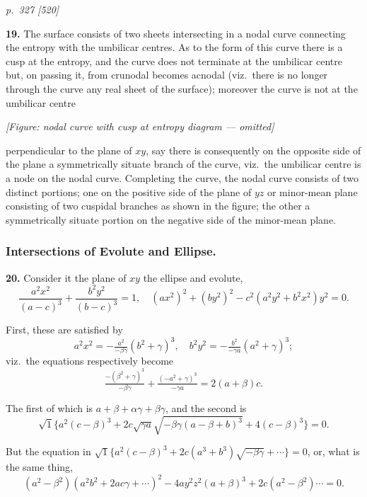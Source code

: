 \documentclass[11pt,a4paper]{article}
\theoremstyle{plain}
\theoremstyle{definition}
\begin{document}
\clearpage

\bigskip
\textit{p.~327 [520]}
\smallskip

\textbf{19.} The surface consists of two sheets intersecting in a nodal curve connecting the entropy with the umbilicar centres. As to the form of this curve there is a cusp at the entropy, and the curve does not terminate at the umbilicar centre but, on passing it, from crunodal becomes acnodal (viz.\ there is no longer through the curve any real sheet of the surface); moreover the curve is not at the umbilicar centre

\begin{center}
\textit{[Figure: nodal curve with cusp at entropy diagram --- omitted]}
\end{center}

perpendicular to the plane of $xy$, say there is consequently on the opposite side of the plane a symmetrically situate branch of the curve, viz.\ the umbilicar centre is a node on the nodal curve. Completing the curve, the nodal curve consists of two distinct portions; one on the positive side of the plane of $yz$ or minor-mean plane consisting of two cuspidal branches as shown in the figure; the other a symmetrically situate portion on the negative side of the minor-mean plane.

\subsubsection*{Intersections of Evolute and Ellipse.}

\textbf{20.} Consider it the plane of $xy$ the ellipse and evolute,
\[
\frac{a^2 x^2}{(a - c)^3} + \frac{b^2 y^2}{(b - c)^3} = 1,\quad (a x^2)^2 + (b y^2)^2 - c^2(a^2 y^2 + b^2 x^2) y^2 = 0.
\]

First, these are satisfied by
\[
a^2 x^2 = -\tfrac{a^2}{-\beta\gamma}(b^2 + \gamma)^3,\quad
b^2 y^2 = -\tfrac{b^2}{-\gamma a}(a^2 + \gamma)^3;
\]
viz.\ the equations respectively become
\[
\tfrac{-(\beta^2 + \gamma)^3}{-\beta\gamma} + \tfrac{(-a^2 + \gamma)^3}{-\gamma a} = 2(a + \beta)c.
\]

The first of which is $a + \beta + \alpha\gamma + \beta\gamma$, and the second is
\[
\sqrt{1}\{a^2(c - \beta)^3 + 2c\sqrt{\gamma a}\sqrt{-\beta\gamma(a - \beta + b)^3} + 4(c - \beta)^3\} = 0.
\]

But the equation in $\sqrt{1}\{a^2(c - \beta)^3 + 2c(a^3 + b^3)\sqrt{-\beta\gamma} + \cdots\} = 0$,
or, what is the same thing,
\[
(a^2 - \beta^2)(a^2 b^2 + 2a c \gamma + \cdots)^2 - 4ay^2 z^2(a + \beta)^3 + 2c(a^2 - \beta^2)\cdots = 0.
\]
\end{document}
